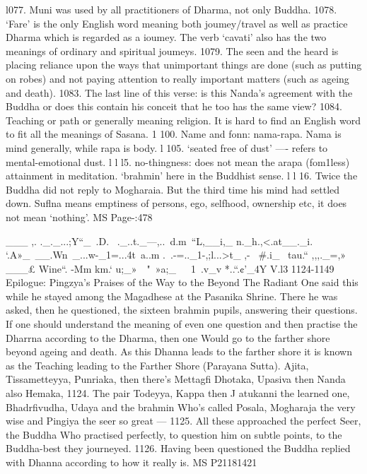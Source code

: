    l077. Muni was used by all practitioners of Dharma, not only Buddha.
   1078. `Fare' is the only English word meaning both joumey/travel as well
   as practice Dharma which is regarded as a ioumey. The verb `cavati' also has the
   two meanings of ordinary and spiritual joumeys.
   1079. The seen and the heard is placing reliance upon the ways that
   unimportant things are done (such as putting on robes) and not paying attention
   to really important matters (such as ageing and death).
   1083. The last line of this verse: is this Nanda's agreement with the
   Buddha or does this contain his conceit that he too has the same view?
   1084. Teaching or path or generally meaning religion. It is hard to ﬁnd
   an English word to ﬁt all the meanings of Sasana.
   1 100. Name and fonn: nama-rapa. Nama is mind generally, while rapa is
   body.
   l 105. `seated free of dust' —- refers to mental-emotional dust.
   l l l5. no-thingness: does not mean the arapa (fom1less) attainment in
   meditation. `brahmin' here in the Buddhist sense.
   l l 16. Twice the Buddha did not reply to Mogharaia. But the third time
   his mind had settled down. Suﬂna means emptiness of persons, ego, selfhood,
   ownership etc, it does not mean `nothing'.
   MS Page-:478
   
   
   
   ___ ,. ._._...;Y“_~.D. ~._..t._—,..~d.m~“L,__i,_ n._h.,<.at__._i. `.A»_~__.Wn~_...w-_1=...4t~a..m .~.-=.._1-,;l...>t_ ,- ~#.i_~ tau.“ ,,,._=,» ___£ Wine“. -Mm  km.` u;_»~~"~»a;_~~~1~\1.v_v *..“.¢'_4Y
   V.l3 1124-1149
   Epilogue: Pingzya's Praises of the Way to the Beyond
   The Radiant One said this while he stayed among the Magadhese at the
   Pasanika Shrine. There he was asked, then he questioned, the sixteen brahmin pupils,
   answering their questions. If one should understand the meaning of even one question
   and then practise the Dharrna according to the Dharma, then one Would go to the
   farther shore beyond ageing and death. As this Dhanna leads to the farther shore it is
   known as the Teaching leading to the Farther Shore (Parayana Sutta).
   Ajita, Tissametteyya,
   Punriaka, then there's Mettagﬁ
   Dhotaka, Upasiva then
   Nanda also Hemaka, 1124.
   The pair Todeyya, Kappa then
   J atukanni the learned one,
   Bhadrﬁvudha, Udaya and
   the brahmin Who's called Posala,
   Mogharaja the very wise
   and Pingiya the seer so great — 1125.
   All these approached the perfect Seer,
   the Buddha Who practised perfectly,
   to question him on subtle points,
   to the Buddha-best they journeyed. 1126.
   Having been questioned the Buddha replied
   with Dhanna according to how it really is.
   MS P21181421
   

